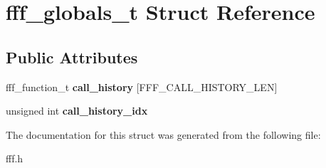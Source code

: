 \hypertarget{structfff__globals__t}{}\section{fff\+\_\+globals\+\_\+t Struct Reference}
\label{structfff__globals__t}
\subsection*{Public Attributes}
\begin{DoxyCompactItemize}
\item 
fff\+\_\+function\+\_\+t {\bfseries call\+\_\+history} \mbox{[}F\+F\+F\+\_\+\+C\+A\+L\+L\+\_\+\+H\+I\+S\+T\+O\+R\+Y\+\_\+\+L\+EN\mbox{]}\hypertarget{structfff__globals__t_a94081826ed0bed160e35607052964374}{}\label{structfff__globals__t_a94081826ed0bed160e35607052964374}

\item 
unsigned int {\bfseries call\+\_\+history\+\_\+idx}\hypertarget{structfff__globals__t_ad5c29f2faa27bef5e706417cd2a73eb5}{}\label{structfff__globals__t_ad5c29f2faa27bef5e706417cd2a73eb5}

\end{DoxyCompactItemize}


The documentation for this struct was generated from the following file\+:\begin{DoxyCompactItemize}
\item 
fff.\+h\end{DoxyCompactItemize}
